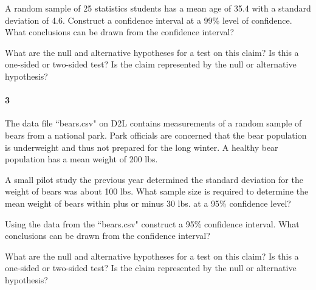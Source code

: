 \documentclass{article}
\begin{document}
\begin{flushleft}
\begin{enumalpha}
\item A random sample of 25 statistics students has a mean age of 35.4 with a standard deviation of 4.6. Construct a confidence interval at a 99\% level of confidence. What conclusions can be drawn from the confidence interval?
\vspace{2.5in}

\item What are the null and alternative hypotheses for a test on this claim? Is this a one-sided or two-sided test? Is the claim represented by the null or alternative hypothesis?
\end{enumalpha}

\newpage
\paragraph{3} The data file ``bears.csv" on D2L contains measurements of a random sample of bears from a national park. Park officials are concerned that the bear population is underweight and thus not prepared for the long winter. A healthy bear population has a mean weight of 200 lbs.
\begin{enumalpha}
\item A small pilot study the previous year determined the standard deviation for the weight of bears was about 100 lbs. What sample size is required to determine the mean weight of bears within plus or minus 30 lbs. at a 95\% confidence level?\\
\vspace{2in}

\item Using the data from the ``bears.csv" construct a 95\% confidence interval.  What conclusions can be drawn from the confidence interval?\\
\vspace{2in}
\item What are the null and alternative hypotheses for a test on this claim? Is this a one-sided or two-sided test? Is the claim represented by the null or alternative hypothesis?
\end{enumalpha}



\end{flushleft}
\end{document}
